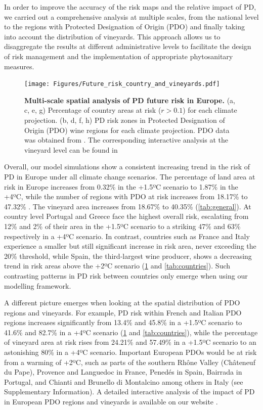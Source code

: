 In order to improve the accuracy of the risk maps and the  relative impact
of PD, we carried out a comprehensive analysis at multiple scales, from the
national level to the regions with Protected Designation of Origin (PDO) and
finally taking into account the distribution of vineyards. This approach allows
us to disaggregate the results at different administrative levels to facilitate
the design of risk management and the implementation of appropriate
phytosanitary measures.

\begin{figure}[t!]
    \centering

    \texttt{[image: Figures/Future\_risk\_country\_and\_vineyards.pdf]}
    \caption[Multi-scale spatial analysis of PD future risk in
        Europe]{\textbf{Multi-scale spatial analysis of PD future risk in
            Europe.} (a, c, e, g) Percentage of country areas at risk ($r>0.1$)
        for each
        climate projection. (b, d, f, h) PD risk zones in Protected Designation
        of
        Origin (PDO) wine regions for each climate projection. PDO data was
        obtained
        from \cite{Candiago2022}. The corresponding interactive analysis at the
        vineyard level can be found in \cite{Webpage}}
    \label{fig:vineyards}
\end{figure}

Overall, our model simulations show a consistent
increasing trend in the risk of PD in Europe under all climate change
scenarios. The percentage of land area at risk in Europe increases from 0.32\%
in the +1.5ºC scenario to 1.87\% in the +4ºC, while the number of regions with
PDO at risk increases from 18.17\% to 47.32\% . The vineyard area  increases
from 18.67\% to 40.35\% (\cref{tab:general}). At country level
Portugal and
Greece face the highest overall risk, escalating from 12\% and 2\% of their
area  in the +1.5ºC scenario to a striking 47\% and 63\%  respectively in a
+4ºC scenario. In contrast, countries such as France and Italy experience a
smaller but still significant increase in risk area, never exceeding the 20\%
threshold, while Spain, the third-largest wine producer, shows a decreasing
trend in risk areas above the +2ºC scenario (\cref{fig:vineyards} and
\cref{tab:countries}). Such contrasting patterns in PD risk between
countries
only emerge when using our modelling framework.

A different picture emerges when looking at the spatial distribution of PDO
regions and vineyards. For example, PD risk within French and Italian PDO
regions increases significantly from 13.4\% and 45.8\% in a +1.5ºC scenario to
41.6\% and 82.7\% in a +4ºC scenario (\cref{fig:vineyards} and
\cref{tab:countries}), while the percentage of vineyard area at
risk rises
from 24.21\% and 57.49\% in a +1.5ºC scenario to an astonishing 80\% in a +4ºC
scenario. Important European PDOs would be at risk from a warming of  +2ºC,
such as parts of the southern Rhône Valley (Châteneuf du Pape), Provence and
Languedoc in France, Penedés in Spain, Bairrada in Portugal, and Chianti and
Brunello di Montalcino among others in Italy (see Supplementary Information). A
detailed interactive analysis of the impact of PD in European PDO regions and
vineyards is available on our website \cite{Webpage}.


